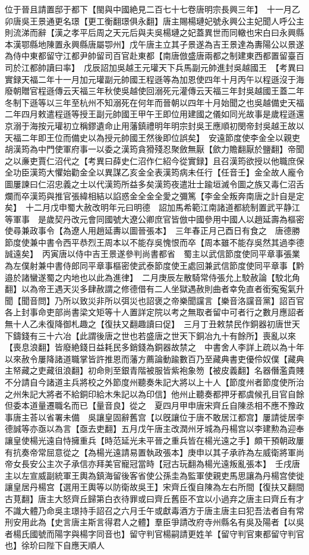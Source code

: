位于晉且請置邸于都下【閩與中國絶見二百七十七卷唐明宗長興三年】　十一月乙卯唐吳王景通更名璟【更工衡翻璟俱永翻】唐主賜楊璉妃號永興公主妃聞人呼公主則流涕而辭【漢之孝平后周之天元后與夫吳楊璉之妃蓋異世而同轍也宋白曰永興縣本漢鄂縣地陳置永興縣唐屬卾州】戊午唐主立其子景遂為吉王景達為夀陽公以景遂為侍中東都留守江都尹帥留司百官赴東都【南唐倣盛唐兩都之制建東西都置留臺百司於江都帥讀曰率】　戊辰詔加吳越王元瓘天下兵馬副元帥進封吳越國王　【考異曰實録天福二年十一月加元瓘副元帥國王程遜等為加恩使四年十月丙午以程遜沒于海廢朝贈官程遜傳云天福三年秋使吳越使回溺死元灌傳云天福三年封吳越國王蓋二年冬制下遜等以三年至杭州不知溺死在何年而晉朝以四年十月始聞之也吳越備史天福二年四月敕遣程遜等授王副元帥國王甲午王即位用建國之儀如同光故事是歲程遜還京溺于海按元瓘初立稱鏐遺命止用藩鎮禮明年明宗封吳王應順初閔帝封吳越王故以天福二年即王位而備史以為授元帥國王然後即位誤矣】　安遠節度使李金全以親吏胡漢筠為中門使軍府事一以委之漢筠貪猾殘忍聚斂無厭【歛力贍翻厭於鹽翻】帝聞之以亷吏賈仁沼代之【考異曰薛史仁沼作仁紹今從實録】且召漢筠欲授以他職庶保全功臣漢筠大懼始勸金全以異謀乙亥金全表漢筠病未任行【任音壬】金全故人龐令圖屢諫曰仁沼忠義之士以代漢筠所益多矣漢筠夜遣壯士踰垣滅令圖之族又毒仁沼舌爛而卒漢筠與推官張緯相結以諂惑金全金全愛之彌篤【李金全叛奔南唐之計自是定矣】　十二月戊申蜀大赦改明年元曰明德　詔加馬希範江南諸道都統制置武平静江等軍事　是歲契丹改元會同國號大遼公卿庶官皆倣中國參用中國人以趙延壽為樞密使尋兼政事令【為遼人用趙延夀以圖晉張本】　三年春正月己酉日有食之　唐德勝節度使兼中書令西平恭烈王周本以不能存吳愧恨而卒【周本雖不能存吳然其過李德誠遠矣】　丙寅唐以侍中吉王景遂參判尚書都省　蜀主以武信節度使同平章事張業為左僕射兼中書侍郎同平章事樞密使武泰節度使王處回兼武信節度使同平章事【黔邉於諸蠻遂蜀之内地也以此為進律】　二月庚辰左散騎常侍張允上駮赦論【駮北角翻】以為帝王遇天災多肆赦謂之修德借有二人坐獄遇赦則曲者幸免直者銜寃寃氣升聞【聞音問】乃所以致災非所以弭災也詔褒之帝樂聞讜言【樂音洛讜音黨】詔百官各上封事命吏部尚書梁文矩等十人置詳定院以考之無取者留中可者行之數月應詔者無十人乙未復降御札趣之【復扶又翻趣讀曰促】　三月丁丑敕禁民作銅器初唐世天下鑄錢有三十六冶【此謂後唐之世也若盛唐之世天下銅冶九十有餘所】喪亂以來【喪息浪翻】皆廢絶錢日益耗民多銷錢為銅器故禁之　中書舍人李詳上疏以為十年以來赦令屢降諸道職掌皆許推恩而藩方薦論動踰數百乃至藏典書吏優伶奴僕【藏典主帑藏之吏藏徂浪翻】初命則至銀青階被服皆紫袍象笏【被皮義翻】名器僭濫貴賤不分請自今諸道主兵將校之外節度州聽奏朱記大將以上十人【節度州者節度使所治之州朱記大將者不給銅印給木朱記以為印信】他州止聽奏都押牙都虞候孔目官自餘但委本道量遷職名而已【量音良】從之　夏四月甲申唐宋齊丘自陳丞相不應不豫政事唐主荅以省署未備　吳讓皇固辭舊宫【以旣讓位于唐不敢居江都宫】屢請徙居李德誠等亦亟以為言【亟去吏翻】五月戊午唐主改潤州牙城為丹楊宫以李建勲為迎奉讓皇使楊光遠自恃擁重兵【時范延光未平晉之重兵皆在楊光遠之手】頗干預朝政屢有抗奏帝常屈意從之【為楊光遠請易置執政張本】庚申以其子承祚為左威衛將軍尚帝女長安公主次子承信亦拜美官寵冠當時【冠古玩翻為楊光遠叛亂張本】　壬戌唐主以左宣威副統軍王輿為鎮海留後客省使公孫圭為監軍使親吏馬思讓為丹楊宫使徙讓皇居丹楊宫【選用王輿等以防衛故吳王】宋齊丘復自陳為左右所間【復扶又翻間古莧翻】唐主大怒齊丘歸第白衣待罪或曰齊丘舊臣不宜以小過弃之唐主曰齊丘有才不識大體乃命吳主璟持手詔召之六月壬午或獻毒酒方于唐主唐主曰犯吾法者自有常刑安用此為【史言唐主斯言得君人之體】羣臣爭請改府寺州縣名有吳及陽者【以吳者楊氏國號而陽字與楊字同音也】留守判官楊嗣請更姓羊【留守判官東都留守判官也】徐玠曰陛下自應天順人